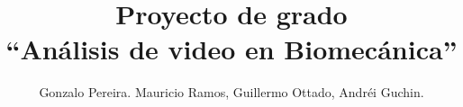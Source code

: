 \documentclass[11pt,a4paper,titlepage,spanish]{article}
\title{Proyecto de grado\\ ``Análisis de video en Biomecánica''}
\author{Gonzalo Pereira. Mauricio Ramos, Guillermo Ottado, Andréi Guchin.}
\date {}
\begin{document}
\maketitle

\newpage
\tableofcontents
\newpage




\clearpage

\clearpage

\clearpage

\clearpage

\clearpage

\clearpage

\clearpage

\clearpage

\clearpage

\clearpage


\nocite{*} %




%
%

\end{document}
